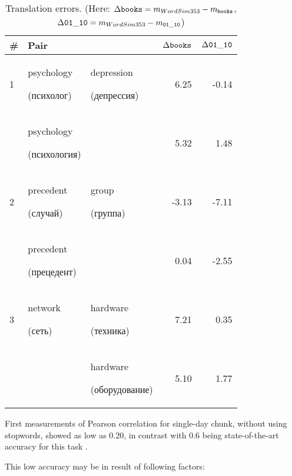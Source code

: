 \documentclass[11pt,letterpaper]{article}
\begin{document}
\begin{table*}[t]
\begin{center}
\begin{tabular}{|l|ll|r|r|}
\hline \bf \# & \bf Pair &  &   $\Delta {\tt books} $ & $ \Delta {\tt 01\_10} $  \\ \hline
1 & psychology  \begin{russian}(психолог)\end{russian} & depression \begin{russian}(депрессия)\end{russian} & 6.25 & -0.14 \\
 & psychology  \begin{russian}(психология)\end{russian} &  & 5.32 & 1.48 \\
\hline
2 & precedent \begin{russian}(случай)\end{russian} & group \begin{russian}(группа)\end{russian}  & -3.13 & -7.11  \\
 & precedent \begin{russian}(прецедент)\end{russian} &  & 0.04 & -2.55  \\
\hline
3 & network \begin{russian}(сеть)\end{russian} & hardware \begin{russian}(техника)\end{russian} & 7.21 & 0.35 \\
 &  & hardware \begin{russian}(оборудование)\end{russian} & 5.10 & 1.77 \\
\hline
\end{tabular}
\end{center}
\caption{\label{translation-error} Translation errors. 
  (Here: $\Delta {\tt books} =  m_{WordSim353} - m_{\tt books}$,
$\Delta {\tt 01\_10} =  m_{WordSim353} - m_{\tt 01\_10}$)
}
\end{table*}

First measurements of Pearson correlation for single-day chunk, without using stopwords, 
showed as low as 0.20, in contrast with 0.6 being state-of-the-art accuracy 
for this task \cite{mikolov2013efficient}.  


This low accuracy may be in result of following factors:
\end{document}
